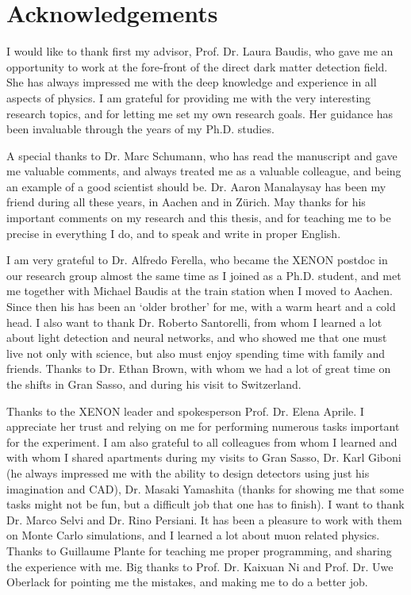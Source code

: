 \chapter*{Acknowledgements}
\label{chAcknowledgements}

I would like to thank first my advisor, Prof. Dr. Laura Baudis, who gave me an opportunity to work at the fore-front of the direct dark matter detection field. She has always impressed me with the deep knowledge and experience in all aspects of physics. I am grateful for providing me with the very interesting research topics, and for letting me set my own research goals. Her guidance has been invaluable through the years of my Ph.D. studies. 

A special thanks to Dr. Marc Schumann, who has read the manuscript and gave me valuable comments, and  always treated me as a valuable colleague, and being an example of a good scientist should be. Dr. Aaron Manalaysay has been my friend during all these years, in Aachen and in Z\"{u}rich. May thanks for his important comments on my research and this thesis, and for teaching me to be precise in everything I do, and to speak and write in proper English. 

I am very grateful to Dr. Alfredo Ferella, who became the XENON postdoc in our research group almost the same time as I joined as a Ph.D. student, and met me together with Michael Baudis at the train station when I moved to Aachen. Since then his has been an `older brother' for me, with a warm heart and a cold head. I also want to thank Dr. Roberto Santorelli, from whom I learned a lot about light detection and neural networks, and who showed me that one must live not only with science, but also must enjoy spending time with family and friends. Thanks to Dr. Ethan Brown, with whom we had a lot of great time on the shifts in Gran Sasso, and during his visit to Switzerland.

Thanks to the XENON leader and spokesperson Prof. Dr. Elena Aprile. I appreciate her trust and relying on me for performing numerous tasks important for the experiment. I am also grateful to all colleagues from whom I learned and with whom I shared apartments during my visits to Gran Sasso, Dr. Karl Giboni (he always impressed me with the ability to design detectors using just his imagination and CAD), Dr. Masaki Yamashita (thanks for showing me that some tasks might not be fun, but a difficult job that one has to finish). I want to thank Dr. Marco Selvi and Dr. Rino Persiani. It has been a pleasure to work with them on Monte Carlo simulations, and I learned a lot about muon related physics. Thanks to Guillaume Plante for teaching me proper programming, and sharing the experience with me. Big thanks to Prof. Dr. Kaixuan Ni and Prof. Dr. Uwe Oberlack for pointing me the mistakes, and making me to do a better job.

